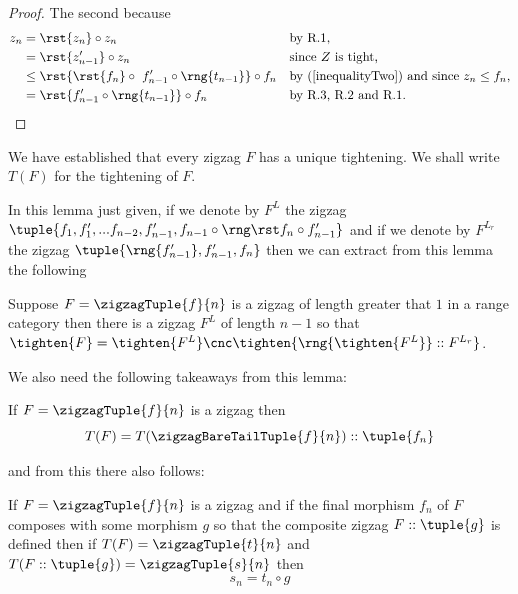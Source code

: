 {\begin{proof}
The second  because
\begin{align*}
 z_n &= \rst{z_n} \circ z_n
         &&\mbox{by R.1,}\\        
     &=  \rst{z'_{n-1}} \circ z_n 
         &&\mbox{since $Z$ is tight,}\\
     &\leq  \rst{\rst{f_n} \circ\ f'_{n-1} \circ \rng{t_{n-1}}} \circ f_n
         &&\mbox{by (\ref{inequalityTwo}) and since $z_n \leq f_n$,} \\
         &= \rst{f'_{n-1} \circ \rng{t_{n-1}}} \circ f_n
         && \mbox{by R.3, R.2 and R.1.}
\end{align*}
\end{proof}
} %
We have established that every zigzag $F$ has a unique tightening. 
We shall write $T(F)$ for the tightening of $F$. 


\begin{worktt}
In this lemma just given, if we denote by $F^L$
the zigzag $\tuple{\tightlead}$
and if we denote by $F^{L_r}$ the zigzag $\tuple{\rng{f'_{n-1}},f'_{n-1},f_n}$
then we can extract from  this lemma the following
\begin{observation}
Suppose  $F=\zigzagTuple{f}{n}$ is a zigzag of length greater that $1$ in a range category \catcw
then there is a zigzag $F^L$ of length $n-1$ so that
$\tighten{F}= \tighten{F^L} \cnc \tighten{\rng{\tighten{F^L}}::F^{L_r}}$. 
\end{observation}
\end{worktt}

We also need the following takeaways from this lemma:
\begin{observation}
If $F=\zigzagTuple{f}{n}$ is a zigzag then
\[
T(F) = T(\zigzagBareTailTuple{f}{n}) ::\tuple{f_n}
\] 
\end{observation}
\noindent and from this there also follows:
\begin{observation}
If  $F=\zigzagTuple{f}{n}$ is a zigzag 
and if the final morphism $f_n$ of $F$ composes with some morphism $g$
 so that the composite zigzag $F :: \tuple{g}$ is defined then
if $T(F)=\zigzagTuple{t}{n}$
and  $T(F :: \tuple{g})=\zigzagTuple{s}{n}$ then
\[
s_n = t_n \circ g
\]
\end{observation}

